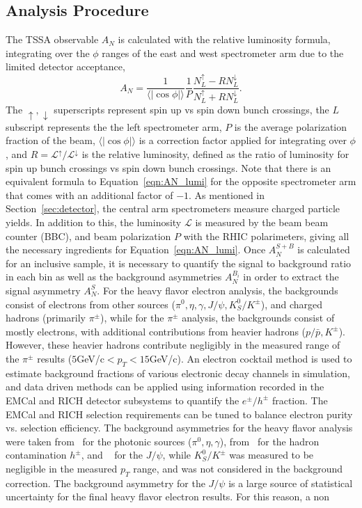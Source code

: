 \documentclass[submission, Proceedings]{SciPost}
\begin{document}
\subsection{Analysis Procedure}\label{sec:procedure}
The TSSA observable $A_{N}$ is calculated with the relative luminosity formula, integrating over the $\phi$ ranges of the east and west spectrometer arm due to the limited detector acceptance, 
\begin{equation}
A_{N} = \frac{1}{\langle \mid \cos \phi \mid \rangle }\frac{1}{P}\frac{N_{L}^{\uparrow} - R N_{L}^{\downarrow}}{N_{L}^{\uparrow} + R N_{L}^{\downarrow}}\label{eqn:AN_lumi}.
\end{equation}
The $\uparrow,\downarrow$ superscripts represent spin up vs spin down bunch crossings, the $L$ subscript represents the the left spectrometer arm, $P$ is the average polarization fraction of the beam, $\langle \mid \cos \phi \mid \rangle$ is a correction factor applied for integrating over $\phi$, and $R = \mathcal{L}^{\uparrow}/\mathcal{L}^{\downarrow}$ is the relative luminosity, defined as the ratio of luminosity for spin up bunch crossings vs spin down bunch crossings. Note that there is an equivalent formula to Equation~\ref{eqn:AN_lumi} for the opposite spectrometer arm that comes with an additional factor of $-1$. As mentioned in Section~\ref{sec:detector}, the central arm spectrometers measure charged particle yields. In addition to this, the luminosity $\mathcal{L}$ is measured by the beam beam counter (BBC), and beam polarization $P$ with the RHIC polarimeters, giving all the necessary ingredients for Equation~\ref{eqn:AN_lumi}. Once $A^{S+B}_{N}$ is calculated for an inclusive sample, it is necessary to quantify the signal to background ratio in each bin as well as the background asymmetries $A_{N}^{B_{i}}$ in order to extract the signal asymmetry $A^{S}_{N}$. For the heavy flavor electron analysis, the backgrounds consist of electrons from other sources ($\pi^{0}, \eta, \gamma, J/\psi, K^{0}_{S}/K^{\pm}$), and charged hadrons (primarily $\pi^{\pm}$), while for the $\pi^{\pm}$ analysis, the backgrounds consist of mostly electrons, with additional contributions from heavier hadrons ($p/\bar{p}, K^{\pm}$). However, these heavier hadrons contribute negligibly in the measured range of the $\pi^{\pm}$ results ($5 $GeV/c$ < p_{T} < 15 $GeV/c). An electron cocktail method is used to estimate background fractions of various electronic decay channels in simulation, and data driven methods can be applied using information recorded in the EMCal and RICH detector subsystems to quantify the $e^{\pm}/h^{\pm}$ fraction. The EMCal and RICH selection requirements can be tuned to balance electron purity vs. selection efficiency. The background asymmetries for the heavy flavor analysis were taken from~\cite{pi0AN, dpAN} for the photonic sources ($\pi^{0}, \eta, \gamma$), from~\cite{hadronAN} for the hadron contamination $h^{\pm}$, and ~\cite{jpsiAN} for the $J/\psi$, while $K^{0}_{S}/K^{\pm}$ was measured to be negligible in the measured $p_{T}$ range, and was not considered in the background correction. The background asymmetry for the $J/\psi$ is a large source of statistical uncertainty for the final heavy flavor electron results. For this reason, a non 
\end{document}
